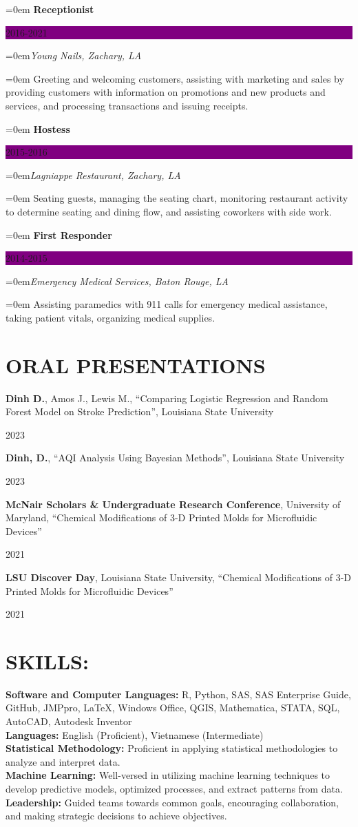 \documentclass[paper=a4,fontsize=11pt]{scrartcl}
\newcommand{\NewPart}[1]{\section*{\uppercase{#1}}}
\newcommand{\DetailEntry}[4]{
		\noindent \hangindent=0em\hangafter=0 \textbf{#1} \hfill 	%
		\colorbox{Purple}{%
			\parbox{10em}{%
			\hfill\color{White}#2}} \par						%
		\vspace{0.2em}
		\noindent \hangindent=0em\hangafter=0\textit{#3} \par		%
		\noindent\hangindent=0em\hangafter=0 \small #4 			%
		\normalsize \par}
\newcommand{\PubEntry}[2]{
\parbox{0.8\textwidth}{#1\\} \hfill #2\\}
\begin{document}
\DetailEntry{Receptionist}{2016-2021}{Young Nails, Zachary, LA}{Greeting and welcoming customers, assisting with marketing and sales by providing customers with information on promotions and new products and services, and processing transactions and issuing receipts.}

\DetailEntry{Hostess}{2015-2016}{Lagniappe Restaurant, Zachary, LA}{Seating guests, managing the seating chart, monitoring restaurant activity to determine seating and dining flow, and assisting coworkers with side work.}

\DetailEntry{First Responder}{2014-2015}{Emergency Medical Services, Baton Rouge, LA}{Assisting paramedics with 911 calls for emergency medical assistance, taking patient vitals, organizing medical supplies.}


\NewPart{Oral Presentations}

\PubEntry{\textbf{Dinh D.}, Amos J., Lewis M.,  “Comparing Logistic Regression and Random Forest Model on Stroke Prediction”, Louisiana State University}{2023}

\PubEntry{\textbf{Dinh, D.}, “AQI Analysis Using Bayesian Methods”,  Louisiana State University}{2023}

\PubEntry{\textbf{McNair Scholars \& Undergraduate Research Conference}, University of Maryland, “Chemical Modifications of 3-D Printed Molds for Microfluidic Devices”}{2021}

\PubEntry{\textbf{LSU Discover Day}, Louisiana State University, “Chemical Modifications of 3-D Printed Molds for Microfluidic Devices”}{2021}





\NewPart{Skills:}
\textbf{Software and Computer Languages:}  R, Python, SAS, SAS Enterprise Guide, GitHub, JMPpro, LaTeX, Windows Office, QGIS, Mathematica, STATA, SQL, AutoCAD, Autodesk Inventor \\

\textbf{Languages:} English (Proficient), Vietnamese (Intermediate)\\

\textbf{Statistical Methodology:} Proficient in applying statistical methodologies to analyze and interpret data.\\

\textbf{Machine Learning:} Well-versed in utilizing machine learning techniques to develop predictive models, optimized processes, and extract patterns from data.\\

\textbf{Leadership:} Guided teams towards common goals, encouraging collaboration, and making strategic decisions to achieve objectives.\\
\end{document}
